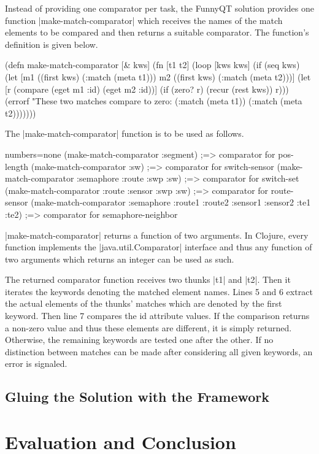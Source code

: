 \documentclass[submission]{eptcs}
\newcommand{\code}{\clojureinline}
\begin{document}
Instead of providing one comparator per task, the FunnyQT solution provides one
function \code|make-match-comparator| which receives the names of the match
elements to be compared and then returns a suitable comparator.  The function's
definition is given below.

\begin{clojurecode}
(defn make-match-comparator [& kws]
  (fn [t1 t2]
    (loop [kws kws]
      (if (seq kws)
        (let [m1 ((first kws) (:match (meta t1)))
              m2 ((first kws) (:match (meta t2)))]
          (let [r (compare (eget m1 :id) (eget m2 :id))]
            (if (zero? r)
              (recur (rest kws))
              r)))
        (errorf "These two matches compare to zero: %
                (:match (meta t1))
                (:match (meta t2)))))))
\end{clojurecode}

The \code|make-match-comparator| function is to be used as follows.

\begin{clojurecode*}{numbers=none}
(make-match-comparator :segment)
;=> comparator for pos-length
(make-match-comparator :sw)
;=> comparator for switch-sensor
(make-match-comparator :semaphore :route :swp :sw)
;=> comparator for switch-set
(make-match-comparator :route :sensor :swp :sw)
;=> comparator for route-sensor
(make-match-comparator :semaphore :route1 :route2 :sensor1 :sensor2 :te1 :te2)
;=> comparator for semaphore-neighbor
\end{clojurecode*}


\code|make-match-comparator| returns a function of two arguments.  In Clojure,
every function implements the \code|java.util.Comparator| interface and thus
any function of two arguments which returns an integer can be used as such.



The returned comparator function receives two thunks \code|t1| and \code|t2|.
Then it iterates the keywords denoting the matched element names.  Lines 5 and
6 extract the actual elements of the thunks' matches which are denoted by the
first keyword.  Then line 7 compares the \textsf{id} attribute values.  If the
comparison returns a non-zero value and thus these elements are different, it
is simply returned.  Otherwise, the remaining keywords are tested one after the
other.  If no distinction between matches can be made after considering all
given keywords, an error is signaled.



\subsection{Gluing the Solution with the Framework}
\label{sec:gluing}



\section{Evaluation and Conclusion}
\label{sec:evaluation}



\end{document}
